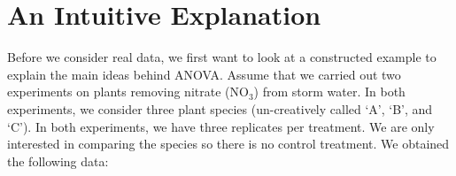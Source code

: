 \documentclass[
  letterpaper,
]{book}
\begin{document}
\section{An Intuitive Explanation}\label{an-intuitive-explanation}

Before we consider real data, we first want to look at a constructed
example to explain the main ideas behind ANOVA. Assume that we carried
out two experiments on plants removing nitrate (NO\(_3\)) from storm
water. In both experiments, we consider three plant species
(un-creatively called `A', `B', and `C'). In both experiments, we have
three replicates per treatment. We are only interested in comparing the
species so there is no control treatment. We obtained the following
data:

\begin{table}

\caption{\label{tbl-panel}Hypothetical Experiment}

\begin{minipage}{0.50\linewidth}



\end{minipage}%
%
\begin{minipage}{0.50\linewidth}



\end{minipage}%

\end{table}%
\end{document}
